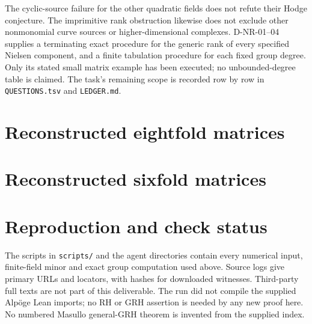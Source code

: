 \documentclass[11pt]{article}
\theoremstyle{remark}\newtheorem{remark}[theorem]{Remark}
\begin{document}
The cyclic-source failure for the other quadratic fields does not refute
their Hodge conjecture. The imprimitive rank obstruction likewise
does not exclude other nonmonomial curve sources or higher-dimensional
complexes. D-NR-01--04 supplies a terminating exact procedure for the generic
rank of every specified Nielsen component, and a finite tabulation
procedure for each fixed group degree. Only its stated small matrix
example has been executed; no unbounded-degree table is claimed. The task's remaining scope is
recorded row by row in \texttt{QUESTIONS.tsv} and \texttt{LEDGER.md}.

\appendix
\section{Reconstructed eightfold matrices}

\section{Reconstructed sixfold matrices}


\section{Reproduction and check status}
The scripts in \texttt{scripts/} and the agent directories contain every
numerical input, finite-field minor and exact group computation used
above. Source logs give primary URLs and locators, with hashes for
downloaded witnesses. Third-party full texts are not part of this
deliverable. The run did not compile the supplied Alp\"oge Lean imports;
no RH or GRH assertion is needed by any new proof here. No numbered
Masullo general-GRH theorem is invented from the supplied index.
\end{document}
